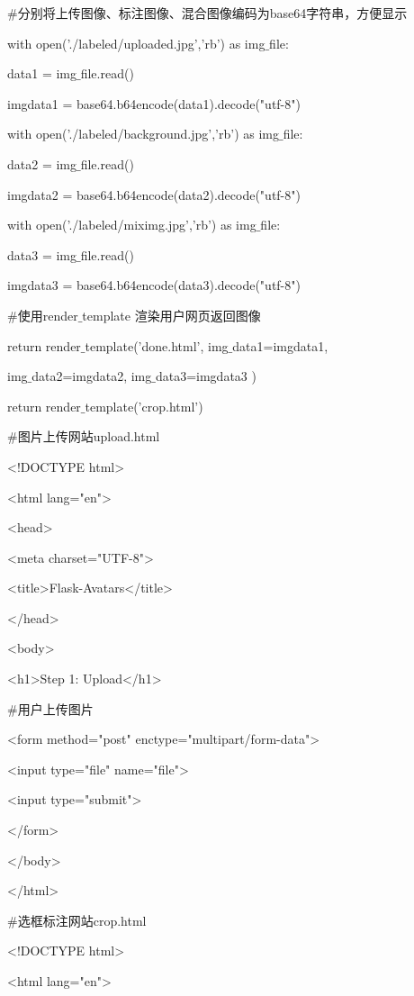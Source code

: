 \documentclass[bachelor_p]{hdu-thesis}
\begin{document}
$\#$分别将上传图像、标注图像、混合图像编码为base64字符串，方便显示

\qquad \qquad with open('./labeled/uploaded.jpg','rb') as img$\_$file:

\qquad \qquad \qquad data1 = img$\_$file.read()

\qquad \qquad \qquad imgdata1 = base64.b64encode(data1).decode("utf-8")
                
\qquad \qquad with open('./labeled/background.jpg','rb') as img$\_$file:

\qquad \qquad \qquad data2 = img$\_$file.read()

\qquad \qquad \qquad imgdata2 = base64.b64encode(data2).decode("utf-8")
                
\qquad \qquad with open('./labeled/miximg.jpg','rb') as img$\_$file:

\qquad \qquad \qquad data3 = img$\_$file.read()

\qquad \qquad \qquad imgdata3 = base64.b64encode(data3).decode("utf-8")
                
$\#$使用render$\_$template 渲染用户网页返回图像

\qquad \qquad return render$\_$template('done.html', img$\_$data1=imgdata1, 

\qquad \qquad img$\_$data2=imgdata2, img$\_$data3=imgdata3 )

\qquad return render$\_$template('crop.html')

$\#$图片上传网站upload.html

<!DOCTYPE html>

<html lang="en">

<head>

<meta charset="UTF-8">

<title>Flask-Avatars</title>

</head>

<body>

<h1>Step 1: Upload</h1>

$\#$用户上传图片

<form method="post" enctype="multipart/form-data">

<input type="file" name="file">

<input type="submit">

</form>

</body>

</html>

$\#$选框标注网站crop.html

<!DOCTYPE html>

<html lang="en">
\end{document}
